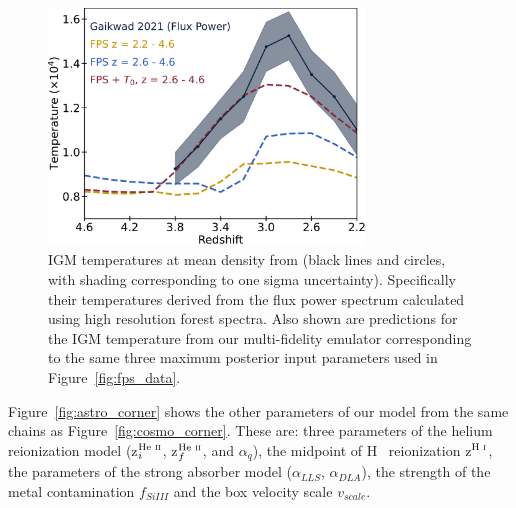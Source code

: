 \begin{figure}
    \centering
    \includegraphics[width=0.75\textwidth]{figures/t0_best_fit.pdf}
    \caption{\label{fig:temp_data}
    IGM temperatures at mean density from \protect\cite{2021MNRAS.506.4389G} (black lines and circles, with shading corresponding to one sigma uncertainty).
    Specifically their temperatures derived from the flux power spectrum calculated using high resolution \lya forest spectra.
    Also shown are predictions for the IGM temperature from our multi-fidelity emulator corresponding to the same three maximum posterior input parameters used in Figure~\protect\ref{fig:fps_data}.
    }
\end{figure}

Figure~\ref{fig:astro_corner} shows the other parameters of our model from the same chains as Figure~\ref{fig:cosmo_corner}.
These are: three parameters of the helium reionization model (z$^{\text{He~{\sc ii}}}_i$, z$^{\text{He~{\sc ii}}}_f$, and $\alpha_q$), the midpoint of H~{} reionization z$^{\text{H~{\sc i}}}$, the parameters of the strong absorber model ($\alpha_{LLS}$, $\alpha_{DLA}$), the strength of the metal contamination $f_{SiIII}$ and the box velocity scale $v_{scale}$.

